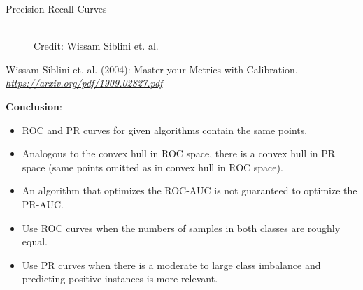 \documentclass[11pt,compress,t,notes=noshow, xcolor=table]{beamer}
\begin{document}
\begin{vbframe}{Precision-Recall Curves}
\begin{figure}
    \centering
    \tiny{\\ Credit: Wissam Siblini et. al. \\}
\end{figure}
\vspace{-0.25cm}
{\tiny{Wissam Siblini et. al. (2004): Master your Metrics with Calibration. \emph{\url{https://arxiv.org/pdf/1909.02827.pdf}}}\par}




\framebreak

\textbf{Conclusion}: \\
\begin{itemize}
  \item ROC and PR curves for given algorithms contain the same points.
  \item Analogous to the convex hull in ROC space, there is a convex hull in PR space (same points omitted as in convex hull in ROC space).
  \item An algorithm that optimizes the ROC-AUC is not guaranteed to optimize
  the PR-AUC.
  \item Use ROC curves when the numbers of samples in both classes are roughly equal.
  \item Use PR curves when there is a moderate to large class
  imbalance and predicting positive instances is more relevant.
\end{itemize}
\end{vbframe}
\end{document}
